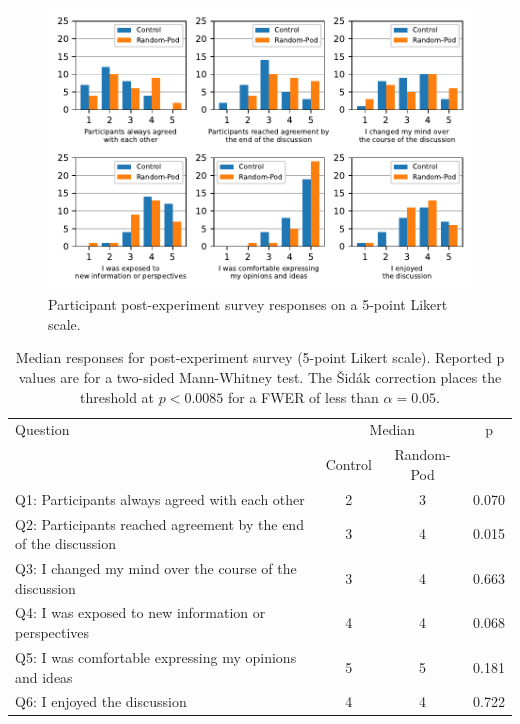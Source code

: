 {\begin{figure}
    \centering
    \includegraphics[width=6in]{chapters/figures/NetDelibExp/fig-survey.pdf}
    \caption{Participant post-experiment survey responses on a 5-point Likert scale.}
    \label{fig:survey}
\end{figure}

\begin{table}[]
    \small
    \centering
    \begin{tabular}{l c c c}
\hline
Question & \multicolumn{2}{c}{Median} & p \\
\cmidrule(lr){2-3}
& Control & Random-Pod & \\
\hline
Q1: Participants always agreed with each other
& 2 & 3 & 0.070 \\
Q2: Participants reached agreement by the end of the discussion
& 3 & 4 & 0.015 \\
Q3: I changed my mind over the course of the discussion
& 3 & 4 & 0.663 \\
Q4: I was exposed to new information or perspectives
& 4 & 4 & 0.068 \\
Q5: I was comfortable expressing my opinions and ideas
& 5 & 5 & 0.181 \\
Q6: I enjoyed the discussion
& 4 & 4 & 0.722 \\
\hline
    \end{tabular}
    \caption{Median responses for post-experiment survey (5-point Likert scale). Reported p values are for a two-sided Mann-Whitney test. The Šidák correction places the threshold at $p < 0.0085$ for a FWER of less than $\alpha=0.05$.}
    \label{tab:survey}
\end{table}

}

